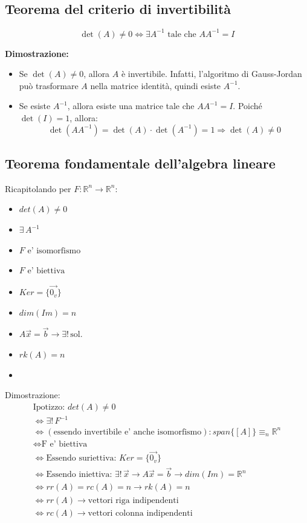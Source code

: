 \documentclass[10pt]{extarticle}
\begin{document}
\subsection{Teorema del criterio di invertibilità}
\[
\det(A) \neq 0 \iff \exists A^{-1} \text{ tale che } A A^{-1} = I
\]

\textbf{Dimostrazione:}
\begin{itemize}
    \item[$\Rightarrow$] Se $\det(A) \neq 0$, allora $A$ è invertibile. Infatti, l'algoritmo di Gauss-Jordan può trasformare $A$ nella matrice identità, quindi esiste $A^{-1}$.
    \item[$\Leftarrow$] Se esiste $A^{-1}$, allora esiste una matrice tale che $A A^{-1} = I$. Poiché $\det(I) = 1$, allora:
    \[
    \det(A A^{-1}) = \det(A) \cdot \det(A^{-1}) = 1 \Rightarrow \det(A) \neq 0
    \]
\end{itemize}
\vspace{1em} 
\subsection{Teorema fondamentale dell'algebra lineare}
Ricapitolando per $F : \mathbb{R}^n \to \mathbb{R}^n$:
\begin{itemize}
    \item $det(A)\neq0$
    \item $\exists \, A^{-1}$
    \item $F \text{ e' isomorfismo}$
    \item $F\text{ e' biettiva}$
    \item $Ker=\{\vec{0_v}\}$
    \item $dim(Im)=n$
    \item $A\vec{x}=\vec{b} \to \exists! \, \text{sol.}$
    \item $rk(A)=n$
    \item {}
\end{itemize}
Dimostrazione:
\begin{align*}
    \text{Ipotizzo: } det(A)\neq0 \\
    \iff \exists! \, F^{-1}\\
    \iff (\text{essendo invertibile e' anche isomorfismo}): span\{[A]\} \equiv_n \mathbb{R}^n \\
    \iff \text{F e' biettiva}\\
    \iff \text{Essendo suriettiva: } Ker=\{\vec{0_v}\} \\
    \iff \text{Essendo iniettiva: } \exists! \, \vec{x} \to A\vec{x}=\vec{b} \to dim(Im)=\mathbb{R}^n \\
    \iff rr(A)=rc(A)=n \to rk(A)=n \\
    \iff rr(A) \to \text{vettori riga indipendenti} \\
    \iff rc(A) \to \text{vettori colonna indipendenti} \\
\end{align*}
\vspace{15em}\\
\end{document}
